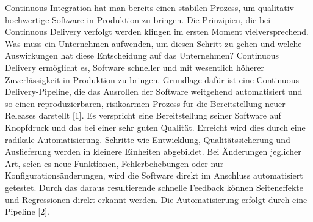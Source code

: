  Continuous Integration hat man bereits einen stabilen Prozess, um qualitativ hochwertige Software in Produktion zu bringen. Die Prinzipien, die bei Continuous Delivery verfolgt werden klingen im ersten Moment vielversprechend. Was muss ein Unternehmen aufwenden, um diesen Schritt zu gehen und welche Auswirkungen hat diese Entscheidung auf das Unternehmen? 
Continuous Delivery ermöglicht es, Software schneller und mit wesentlich höherer Zuverlässigkeit in Produktion zu bringen. Grundlage dafür ist eine Continuous-Delivery-Pipeline, die das Ausrollen der Software weitgehend automatisiert und so einen reproduzierbaren, risikoarmen Prozess für die Bereitstellung neuer Releases darstellt [1]. Es verspricht eine Bereitstellung seiner Software auf Knopfdruck und das bei einer sehr guten Qualität. Erreicht wird dies durch eine radikale Automatisierung. Schritte wie Entwicklung, Qualitätssicherung und Auslieferung werden in kleinere Einheiten abgebildet. Bei Änderungen jeglicher Art, seien es neue Funktionen, Fehlerbehebungen oder nur Konfigurationsänderungen, wird die Software direkt im Anschluss automatisiert getestet. Durch das daraus resultierende schnelle Feedback können Seiteneffekte und Regressionen direkt erkannt werden. Die Automatisierung erfolgt durch eine Pipeline [2]. 
